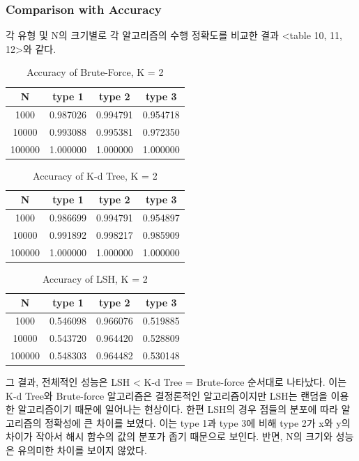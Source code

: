 \documentclass{sig-alternate-05-2015}
\begin{document}
\begin{CJK}{UTF8}{mj}
\subsubsection{Comparison with Accuracy}
각 유형 및 N의 크기별로 각 알고리즘의 수행 정확도를 비교한 결과 <table 10, 11, 12>와 같다.
\begin{table}
\centering
\caption{Accuracy of Brute-Force, K = 2}
\begin{tabular}{|c|c|c|c|} \hline
N & type 1 & type 2 & type 3 \\ \hline
1000 & 0.987026 & 0.994791 & 0.954718 \\ \hline
10000 & 0.993088 & 0.995381 & 0.972350 \\ \hline
100000 & 1.000000 & 1.000000 & 1.000000 \\ 
\hline\end{tabular}
\end{table}

\begin{table}
\centering
\caption{Accuracy of K-d Tree, K = 2}
\begin{tabular}{|c|c|c|c|} \hline
N & type 1 & type 2 & type 3 \\ \hline
1000 & 0.986699 & 0.994791 & 0.954897 \\ \hline
10000 & 0.991892 & 0.998217 & 0.985909 \\ \hline
100000 & 1.000000 & 1.000000 & 1.000000 \\ 
\hline\end{tabular}
\end{table}

\begin{table}
\centering
\caption{Accuracy of LSH, K = 2}
\begin{tabular}{|c|c|c|c|} \hline
N & type 1 & type 2 & type 3 \\ \hline
1000 & 0.546098 & 0.966076 & 0.519885 \\ \hline
10000 & 0.543720 & 0.964420 & 0.528809 \\ \hline
100000 & 0.548303 & 0.964482 & 0.530148 \\ 
\hline\end{tabular}
\end{table}

그 결과, 전체적인 성능은 LSH < K-d Tree = Brute-force 순서대로 나타났다. 이는 K-d Tree와 Brute-force 알고리즘은 결정론적인 알고리즘이지만 LSH는 랜덤을 이용한 알고리즘이기 때문에 일어나는 현상이다. 한편  LSH의 경우 점들의 분포에 따라 알고리즘의 정확성에 큰 차이를 보였다. 이는 type 1과 type 3에 비해 type 2가 x와 y의 차이가 작아서 해시 함수의 값의 분포가 좁기 때문으로 보인다. 반면, N의 크기와 성능은 유의미한 차이를 보이지 않았다.


\end{CJK}
\end{document}
